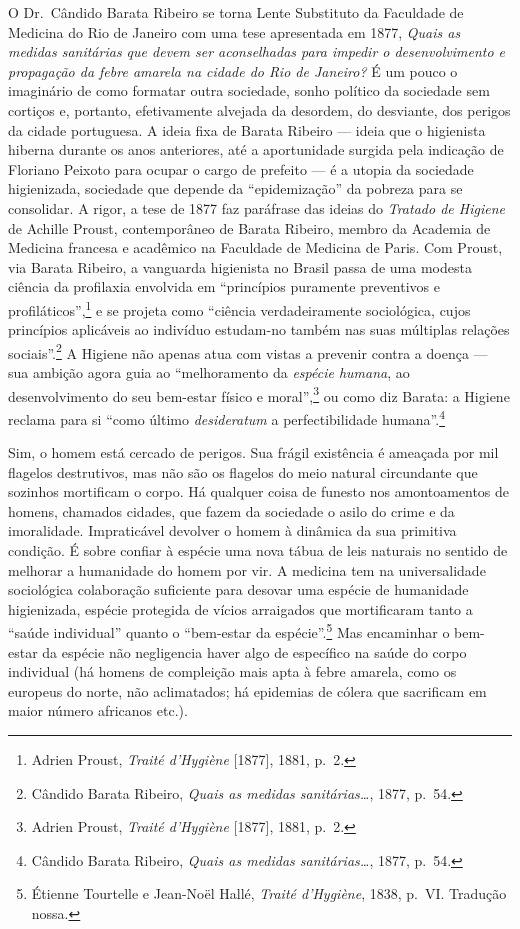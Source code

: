 O Dr.~Cândido Barata Ribeiro se torna Lente Substituto da Faculdade de
Medicina do Rio de Janeiro com uma tese apresentada em 1877, \textit{Quais
as medidas sanitárias que devem ser aconselhadas para impedir o
desenvolvimento e propagação da febre amarela na cidade do Rio de
Janeiro?} É um pouco o imaginário de como formatar outra sociedade,
sonho político da sociedade sem cortiços e, portanto, efetivamente
alvejada da desordem, do desviante, dos perigos da cidade portuguesa. A
ideia fixa de Barata Ribeiro --- ideia que o higienista hiberna durante
os anos anteriores, até a aportunidade surgida pela indicação de
Floriano Peixoto para ocupar o cargo de prefeito --- é a utopia da
sociedade higienizada, sociedade que depende da ``epidemização'' da
pobreza para se consolidar. A rigor, a tese de 1877 faz paráfrase das
ideias do \textit{Tratado de Higiene} de Achille Proust, contemporâneo de
Barata Ribeiro, membro da Academia de Medicina francesa e acadêmico na
Faculdade de Medicina de Paris. Com Proust, via Barata Ribeiro, a
vanguarda higienista no Brasil passa de uma modesta ciência da
profilaxia envolvida em ``princípios puramente preventivos e
profiláticos'',\footnote{Adrien Proust, \textit{Traité d'Hygiène}
  {[}1877{]}, 1881, p.~2.} e se projeta como ``ciência verdadeiramente
sociológica, cujos princípios aplicáveis ao indivíduo estudam-no também
nas suas múltiplas relações sociais''.\footnote{Cândido Barata Ribeiro,
  \textit{Quais as medidas sanitárias\ldots{}}, 1877, p.~54.} A Higiene
não apenas atua com vistas a prevenir contra a doença --- sua ambição
agora guia ao ``melhoramento da \textit{espécie humana}, ao
desenvolvimento do seu bem-estar físico e moral'',\footnote{Adrien
  Proust, \textit{Traité d'Hygiène} {[}1877{]}, 1881, p.~2.} ou como diz
Barata: a Higiene reclama para si ``como último \textit{desideratum} a
perfectibilidade humana''.\footnote{Cândido Barata Ribeiro, \textit{Quais
  as medidas sanitárias\ldots{}}, 1877, p.~54.}

Sim, o homem está cercado de perigos. Sua frágil existência é ameaçada
por mil flagelos destrutivos, mas não são os flagelos do meio natural
circundante que sozinhos mortificam o corpo. Há qualquer coisa de
funesto nos amontoamentos de homens, chamados cidades, que fazem da
sociedade o asilo do crime e da imoralidade. Impraticável devolver o
homem à dinâmica da sua primitiva condição. É sobre confiar à espécie
uma nova tábua de leis naturais no sentido de melhorar a humanidade do
homem por vir. A medicina tem na universalidade sociológica colaboração
suficiente para desovar uma espécie de humanidade higienizada, espécie
protegida de vícios arraigados que mortificaram tanto a ``saúde
individual'' quanto o ``bem-estar da espécie''.\footnote{Étienne
  Tourtelle e Jean-Noël Hallé, \textit{Traité d'Hygiène}, 1838, p.~VI.
  Tradução nossa.} Mas encaminhar o bem-estar da espécie não negligencia
haver algo de específico na saúde do corpo individual (há homens de
compleição mais apta à febre amarela, como os europeus do norte, não
aclimatados; há epidemias de cólera que sacrificam em maior número
africanos etc.).

